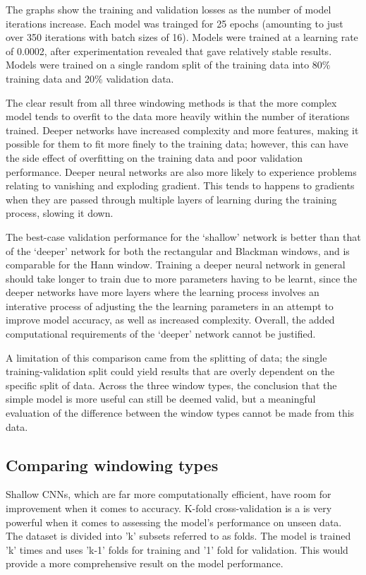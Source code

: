 \documentclass[class=report,11pt,crop=false]{standalone}
\begin{document}
The graphs show the training and validation losses as the number of model iterations increase. Each model was trainged for 25 epochs (amounting to just over 350 iterations with batch sizes of 16). Models were trained at a learning rate of 0.0002, after experimentation revealed that gave relatively stable results. Models were trained on a single random split of the training data into 80\% training data and 20\% validation data.

The clear result from all three windowing methods is that the more complex model tends to overfit to the data more heavily within the number of iterations trained. Deeper networks have increased complexity and more features, making it possible for them to fit more finely to the training data; however, this can have the side effect of overfitting on the training data and poor validation performance. Deeper neural networks are also more likely to experience problems relating to vanishing and exploding gradient. This tends to happens to gradients when they are passed through multiple layers of learning during the training process, slowing it down.

The best-case validation performance for the `shallow' network is better than that of the `deeper' network for both the rectangular and Blackman windows, and is comparable for the Hann window. Training a deeper neural network in general should take longer to train due to more parameters having to be learnt, since the deeper networks have more layers where the learning process involves an interative process of adjusting the the learning parameters in an attempt to improve model accuracy, as well as increased complexity. Overall, the added computational requirements of the `deeper' network cannot be justified.

A limitation of this comparison came from the splitting of data; the single training-validation split could yield results that are overly dependent on the specific split of data. Across the three window types, the conclusion that the simple model is more useful can still be deemed valid, but a meaningful evaluation of the difference between the window types cannot be made from this data.



\subsection{Comparing windowing types} \label{ss:windowtypes}


Shallow CNNs, which are far more computationally efficient, have room for improvement when it comes to accuracy. K-fold cross-validation is a is very powerful when it comes to assessing the model's performance on unseen data. The dataset is divided into 'k' subsets referred to as folds. The model is trained 'k' times and uses 'k-1' folds for training and '1' fold for validation. This would provide a more comprehensive result on the model performance. 
\end{document}
